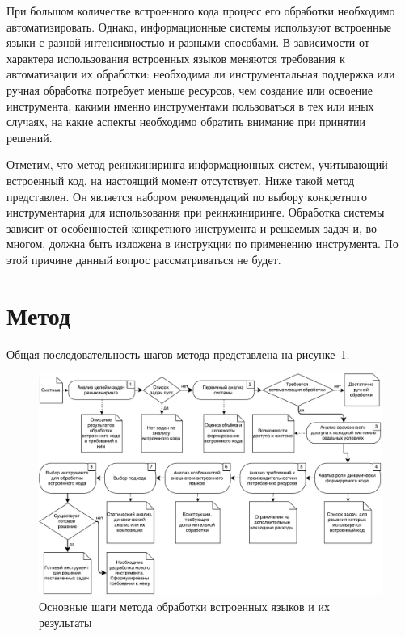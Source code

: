 При большом количестве встроенного кода процесс его обработки необходимо автоматизировать. Однако, информационные системы используют встроенные языки с разной интенсивностью и разными способами. В зависимости от характера использования встроенных языков меняются требования к автоматизации их обработки: необходима ли инструментальная поддержка или ручная обработка потребует меньше ресурсов, чем создание или освоение инструмента, какими именно инструментами пользоваться в тех или иных случаях, на какие аспекты необходимо обратить внимание при принятии решений.

Отметим, что метод реинжиниринга информационных систем, учитывающий встроенный код, на настоящий момент отсутствует. Ниже такой метод представлен. Он является набором рекомендаций по выбору конкретного инструментария для использования при реинжиниринге. Обработка системы зависит от особенностей конкретного инструмента и решаемых задач и, во многом, должна быть изложена в инструкции по применению инструмента. По этой причине данный вопрос рассматриваться не будет.


\section{Метод}

Общая последовательность шагов метода представлена на рисунке~\ref{fig:method}.

\begin{figure}
\begin{center}
\includegraphics[width=.95\textwidth]{pics/ReengMethodSteps}
\caption{Основные шаги метода обработки встроенных языков и их результаты}
\label{fig:method} 
\end{center}
\end{figure}

